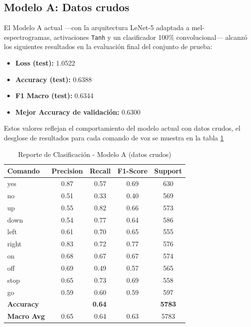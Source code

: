 \documentclass[conference]{IEEEtran}
\begin{document}
\subsection{Modelo A: Datos crudos}

El Modelo A actual —con la arquitectura LeNet-5 adaptada a mel-espectrogramas, activaciones \texttt{Tanh} y un clasificador 100\% convolucional— alcanzó los siguientes resultados en la evaluación final del conjunto de prueba:

\begin{itemize}
    \item \textbf{Loss (test):} 1.0522
    \item \textbf{Accuracy (test):} 0.6388
    \item \textbf{F1 Macro (test):} 0.6344
    \item \textbf{Mejor Accuracy de validación:} 0.6300
\end{itemize}

Estos valores reflejan el comportamiento del modelo actual con datos crudos, el desglose de resultados para cada comando de voz se muestra en la tabla \ref{tab:metricas_a}

\begin{table}[htbp]
\caption{Reporte de Clasificación - Modelo A (datos crudos)}
\label{tab:metricas_a}
\centering
\begin{tabular}{lcccc}
\toprule
\textbf{Comando} & \textbf{Precision} & \textbf{Recall} & \textbf{F1-Score} & \textbf{Support} \\
\midrule
yes   & 0.87 & 0.57 & 0.69 & 630 \\
no    & 0.51 & 0.33 & 0.40 & 569 \\
up    & 0.55 & 0.82 & 0.66 & 573 \\
down  & 0.54 & 0.77 & 0.64 & 586 \\
left  & 0.61 & 0.70 & 0.65 & 555 \\
right & 0.83 & 0.72 & 0.77 & 576 \\
on    & 0.68 & 0.67 & 0.67 & 574 \\
off   & 0.69 & 0.49 & 0.57 & 565 \\
stop  & 0.65 & 0.73 & 0.69 & 558 \\
go    & 0.59 & 0.60 & 0.59 & 597 \\
\midrule
\textbf{Accuracy} & \multicolumn{3}{c}{\textbf{0.64}} & \textbf{5783} \\
\textbf{Macro Avg}& 0.65 & 0.64 & 0.63 & 5783 \\
\bottomrule
\end{tabular}
\end{table}
\end{document}
